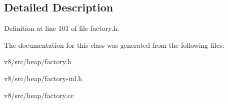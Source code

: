 \subsection{Detailed Description}


Definition at line 101 of file factory.\+h.



The documentation for this class was generated from the following files\+:\begin{DoxyCompactItemize}
\item 
v8/src/heap/factory.\+h\item 
v8/src/heap/factory-\/inl.\+h\item 
v8/src/heap/factory.\+cc\end{DoxyCompactItemize}
